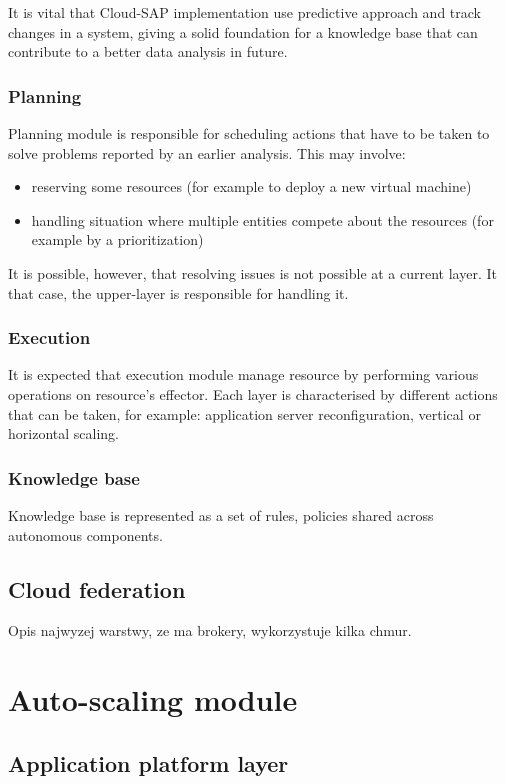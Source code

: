 It is vital that Cloud-SAP implementation use predictive approach \cite{JiPeLiCh11} and track changes \cite{ZhYaWo05} in a system, giving a solid foundation for a knowledge base that can contribute to a better data analysis in future.

\subsubsection{Planning}
Planning module is responsible for scheduling actions that have to be taken to solve problems reported by an earlier analysis. This may involve:
\begin{itemize}
 \item reserving some resources (for example to deploy a new virtual machine)
 \item handling situation where multiple entities compete about the resources (for example by a prioritization)
\end{itemize}

It is possible, however, that resolving issues is not possible at a current layer. It that case, the upper-layer is responsible for handling it.

\subsubsection{Execution}
It is expected that execution module manage resource by performing various operations on resource's effector. Each layer is characterised by different actions that can be taken, for example: application server reconfiguration, vertical or horizontal scaling.

\subsubsection{Knowledge base}
Knowledge base is represented as a set of rules, policies shared across autonomous components.

\subsection{Cloud federation}
Opis najwyzej warstwy, ze ma brokery, wykorzystuje kilka chmur.


\section{Auto-scaling module}

\subsection{Application platform layer}


